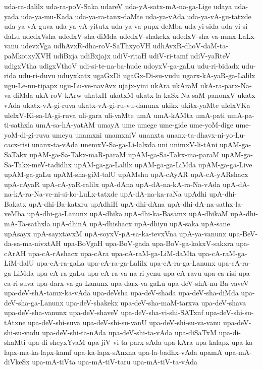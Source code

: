 {uda-ra-dalilx
uda-ra-poV-Saka
udareV
uda-yA-satx-mA-na-ga-Lige
udaya
uda-yada
uda-ya-mu-Kada
uda-ya-ra-tanx-daMte
uda-ya-vAda
uda-ya-vA-gu-tatxde
uda-ya-vA-guva
uda-ya-vA-yitutx
uda-ya-va-pupx-deMba
uda-yi-sida
uda-yi-si-daLu
udedxVsha
udedxV-sha-diMda
udedxV-shakekx
udedxV-sha-va-nunx-LaLx-vanu
udevxVga
udhAvxR-dha-roV-SaThxyoVH
udhAvxR-dhoV-daM-ta-paMkotxyXVH
udiBxja
udiBxjajx
udiV-ritaH
udiV-ri-tamf
udiV-yaRteV
udigxVtha
udigxVthoV
udi-si-te-na-ba-hude
udoyxV-ga-gaLu
udu-ri-bidadx
udu-rida
udu-ri-duvu
uduyxkatx
ugaGxDi
ugaGx-Di-su-vudu
ugarx-kA-yaR-ga-Lalilx
ugu-Le-nu-tipapx
ugu-Lu-ve-navAvx
ujajx-yini
ukAra
ukAraM
ukA-ra-parx-Na-va-diMda
ukA-roV-kArw
ukatxH
ukatxM
ukatx-la-kaSx-Na-saM-panonxV
ukatx-vAda
ukatx-vA-gi-ruva
ukatx-vA-gi-ru-vu-danunx
ukikx
ukitx-yaMte
ulelxVKa
ulelxV-Ki-sa-lA-gi-ruva
uli-gara
uli-vaMte
umA
umA-kAMta
umA-pati
umA-pa-ti-sathxla
umA-sa-hA-yatAM
umayA
ume
umege
ume-gide
ume-yoM-dige
ume-yoM-di-gi-ruva
umeyu
unamxni
unamxniV
unanxta
unanx-ta-dhavx-ni-yo-Lu-cacx-risi
unanx-ta-vAda
unemxV-Sa-ga-Li-lalxda
uni
unimxV-li-tAni
upAM-ga-SaTakx
upAM-ga-Sa-Takx-maR-paraM
upAM-ga-Sa-Takx-ma-paraM
upAM-ga-Sa-Takx-meV-tadidhx
upAM-ga-ga-Lalilx
upAM-ga-ga-LiMda
upAM-ga-ga-Live
upAM-ga-gaLu
upAM-sha-giM-talU
upAMshu
upA-cAyAR
upA-cA-yARshacx
upA-cAyaR
upA-cA-yaR-ralilx
upA-dAna
upA-dA-na-kA-ra-Na-vAda
upA-dA-na-kA-ra-Na-ve-ni-si-ko-LuLx-tatxde
upA-dA-na-ka-raNa
upAdhi
upA-dhi-Bakatx
upA-dhi-Ba-katxru
upAdhiH
upA-dhi-dAna
upA-dhi-dA-na-sathx-la-veMba
upA-dhi-ga-Lanunx
upA-dhika
upA-dhi-ka-Basamx
upA-dhikaM
upA-dhi-mA-Ta-sathxla
upA-dhinA
upA-dhishacx
upA-dhiyu
upA-saka
upA-sane
upAsayx
upA-sayxtavxM
upA-soyxV-pA-sa-ka-tevxVna
upA-ya-vanunx
upa-BeV-da-sa-ma-nivxtAH
upa-BoVgaH
upa-BoV-gada
upa-BoV-ga-kokxV-sakxra
upa-cArAH
upa-cA-rAshacx
upa-cAra
upa-cA-raM-ga-LiM-daMta
upa-cA-raM-ga-LiM-dalU
upa-cA-ra-gaLa
upa-cA-ra-ga-Lalilx
upa-cA-ra-ga-Lanunx
upa-cA-ra-ga-LiMda
upa-cA-ra-gaLu
upa-cA-ra-va-na-ri-yenu
upa-cA-ravu
upa-ca-risi
upa-ca-ri-suva
upa-darx-va-ga-Lanunx
upa-darx-va-gaLu
upa-deV-shA-nu-Ba-vaveV
upa-deV-shA-tamx-ka-vAda
upa-deVsha
upa-deV-shada
upa-deV-sha-diMda
upa-deV-sha-ga-Lanunx
upa-deV-shakekx
upa-deV-sha-maM-tarxva
upa-deV-shava
upa-deV-sha-vanunx
upa-deV-shaveV
upa-deV-sha-vi-shi-SATxnf
upa-deV-shi-su-tAtxne
upa-deV-shi-suva
upa-deV-shi-su-vanU
upa-deV-shi-su-va-vanu
upa-deV-shi-su-vudu
upa-deV-shi-ta-nAda
upa-deV-shi-ta-vAda
upa-diSaTxM
upa-di-shaMti
upa-di-sheyxYvaM
upa-jiV-vi-ta-parx-sAda
upa-kAra
upa-kalapx
upa-ka-lapx-ma-ka-lapx-kamf
upa-ka-lapx-sAnxna
upa-la-badhx-vAda
upamA
upa-mA-diVkeSx
upa-mA-tiVta
upa-mA-tiV-taru
upa-mA-tiV-ta-vAda
}
